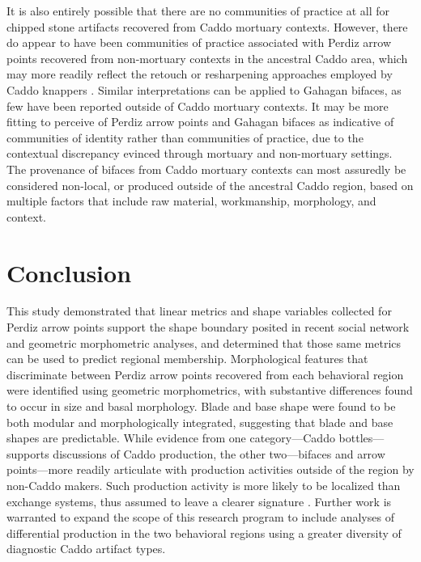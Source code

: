 \documentclass[smallextended]{svjour3}       %
\begin{document}
It is also entirely possible that there are no communities of practice
at all for chipped stone artifacts recovered from Caddo mortuary
contexts. However, there do appear to have been communities of practice
associated with Perdiz arrow points recovered from non-mortuary contexts
in the ancestral Caddo area, which may more readily reflect the retouch
or resharpening approaches employed by Caddo knappers
\cite{RN9364,RN8486,RN11097}. Similar interpretations can be applied to
Gahagan bifaces, as few have been reported outside of Caddo mortuary
contexts. It may be more fitting to perceive of Perdiz arrow points and
Gahagan bifaces as indicative of communities of identity rather than
communities of practice, due to the contextual discrepancy evinced
through mortuary and non-mortuary settings. The provenance of bifaces
from Caddo mortuary contexts can most assuredly be considered non-local,
or produced outside of the ancestral Caddo region, based on multiple
factors that include raw material, workmanship, morphology, and context.

\hypertarget{conclusion}{%
\section{Conclusion}\label{conclusion}}

This study demonstrated that linear metrics and shape variables
collected for Perdiz arrow points support the shape boundary posited in
recent social network and geometric morphometric analyses, and
determined that those same metrics can be used to predict regional
membership. Morphological features that discriminate between Perdiz
arrow points recovered from each behavioral region were identified using
geometric morphometrics, with substantive differences found to occur in
size and basal morphology. Blade and base shape were found to be both
modular and morphologically integrated, suggesting that blade and base
shapes are predictable. While evidence from one category---Caddo
bottles---supports discussions of Caddo production, the other
two---bifaces and arrow points---more readily articulate with production
activities outside of the region by non-Caddo makers. Such production
activity is more likely to be localized than exchange systems, thus
assumed to leave a clearer signature \cite{RN7019}. Further work is
warranted to expand the scope of this research program to include
analyses of differential production in the two behavioral regions using
a greater diversity of diagnostic Caddo artifact types.
\end{document}
